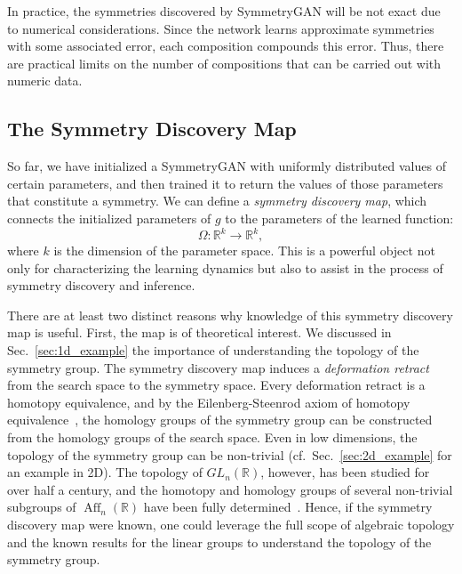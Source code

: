 \documentclass[aps,prx,reprint,preprintnumbers,superscriptaddress,nofootinbib,longbibliography,floatfix]{revtex4-1}
\newcommand{\R}{\mathbb{R}}
\DeclareRobustCommand{\Sec}[1]{Sec.~\ref{sec:#1}}
\begin{document}
In practice, the symmetries discovered by SymmetryGAN will be not exact due to numerical considerations.
%
Since the network learns approximate symmetries with some associated error, each composition compounds this error.
%
Thus, there are practical limits on the number of compositions that can be carried out with numeric data.


\subsection{The Symmetry Discovery Map}
\label{sec:symmetry_discovery_map}

So far, we have initialized a SymmetryGAN with uniformly distributed values of certain parameters, and then trained it to return the values of those parameters that constitute a symmetry.
%
We can define a \textit{symmetry discovery map}, which connects the initialized parameters of $g$ to the parameters of the learned function:
%
\begin{equation}
\Omega: \R^k \to \R^k,
\end{equation}
%
where $k$ is the dimension of the parameter space.
%
This is a powerful object not only for characterizing the learning dynamics but also to assist in the process of symmetry discovery and inference.


There are at least two distinct reasons why knowledge of this symmetry discovery map is useful.
%
First, the map is of theoretical interest.
%
We discussed in \Sec{1d_example} the importance of understanding the topology of the symmetry group. 
%
The symmetry discovery map induces a \emph{deformation retract} from the search space to the symmetry space.
%
Every deformation retract is a homotopy equivalence, and by the Eilenberg-Steenrod axiom of homotopy equivalence~\cite{Eilenberg117}, the homology groups of the symmetry group can be constructed from the homology groups of the search space.
%
Even in low dimensions, the topology of the symmetry group can be non-trivial (cf.~\Sec{2d_example} for an example in 2D).
%
The topology of $GL_n(\R)$, however, has been studied for over half a century, and the homotopy and homology groups of several non-trivial subgroups of $\operatorname{Aff}_n(\R)$ have been fully determined~\cite{SCHLICHTING20171}.
%
Hence, if the symmetry discovery map were known, one could leverage the full scope of algebraic topology and the known results for the linear groups to understand the topology of the symmetry group.
\end{document}
